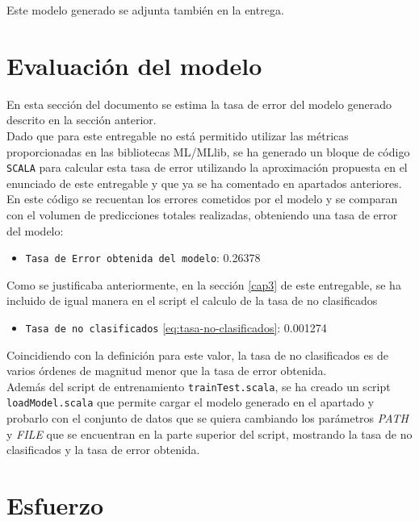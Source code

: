 \documentclass[12pt]{article}
\begin{document}
Este modelo generado se adjunta también en la entrega.

\section{Evaluación del modelo}
En esta sección del documento se estima la tasa de error del modelo generado descrito en la sección anterior.\\

Dado que para este entregable no está permitido utilizar las métricas proporcionadas en las bibliotecas ML/MLlib, se ha generado un bloque de código \texttt{SCALA} para calcular esta tasa de error utilizando la aproximación propuesta en el enunciado de este entregable y que ya se ha comentado en apartados anteriores. En este código se recuentan los errores cometidos por el modelo y se comparan con el volumen de predicciones totales realizadas, obteniendo una tasa de error del modelo:

\begin{itemize}
    \item \texttt{Tasa de Error obtenida del modelo}: 0.26378
\end{itemize}

Como se justificaba anteriormente, en la sección \ref{cap3} de este entregable, se ha incluido de igual manera en el script el calculo de la tasa de no clasificados

\begin{itemize}
    \item \texttt{Tasa de no clasificados} \ref{eq:tasa-no-clasificados}: 0.001274
\end{itemize}

Coincidiendo con la definición para este valor, la tasa de no clasificados es de varios órdenes de magnitud menor que la tasa de error obtenida.\\

Además del script de entrenamiento \texttt{trainTest.scala}, se ha creado un script \texttt{loadModel.scala} que permite cargar el modelo generado en el apartado  y probarlo con el conjunto de datos que se quiera cambiando los parámetros \textit{PATH} y \textit{FILE} que se encuentran en la parte superior del script, mostrando la tasa de no clasificados y la tasa de error obtenida.\\

\section{Esfuerzo}
\end{document}
